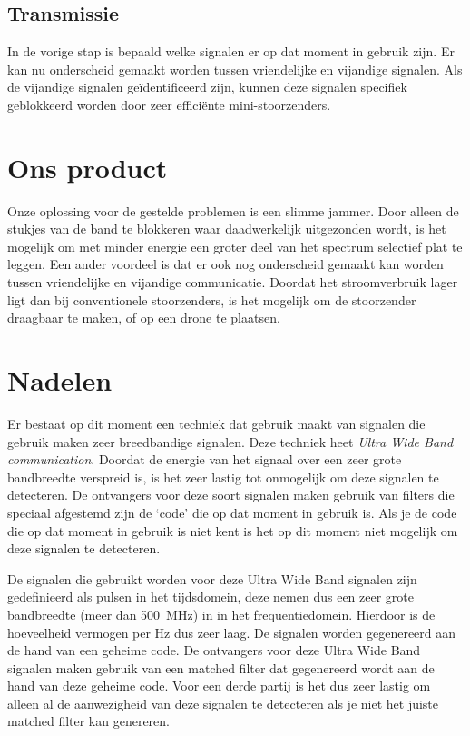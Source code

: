 \documentclass[oneside, a4paper, openany]{memoir}
\begin{document}
\subsection{Transmissie}
In de vorige stap is bepaald welke signalen er op dat moment in gebruik zijn. Er kan nu onderscheid gemaakt worden tussen vriendelijke en vijandige signalen. Als de vijandige signalen geïdentificeerd zijn, kunnen deze signalen specifiek geblokkeerd worden door zeer efficiënte mini-stoorzenders.

\section{Ons product}
Onze oplossing voor de gestelde problemen is een slimme jammer. Door alleen de stukjes van de band te blokkeren waar daadwerkelijk uitgezonden wordt, is het mogelijk om met minder energie een groter deel van het spectrum selectief plat te leggen. Een ander voordeel is dat er ook nog onderscheid gemaakt kan worden tussen vriendelijke en vijandige communicatie. Doordat het stroomverbruik lager ligt dan bij conventionele stoorzenders, is het mogelijk om de stoorzender draagbaar te maken, of op een drone te plaatsen.

\section{Nadelen}
Er bestaat op dit moment een techniek dat gebruik maakt van signalen die gebruik maken zeer breedbandige signalen. Deze techniek heet \textit{Ultra Wide Band communication}. Doordat de energie van het signaal over een zeer grote bandbreedte verspreid is, is het zeer lastig tot onmogelijk om deze signalen te detecteren. De ontvangers voor deze soort signalen maken gebruik van filters die speciaal afgestemd zijn de `code' die op dat moment in gebruik is. Als je de code die op dat moment in gebruik is niet kent is het op dit moment niet mogelijk om deze signalen te detecteren.

\begin{blockDetail}
De signalen die gebruikt worden voor deze Ultra Wide Band signalen zijn gedefinieerd als pulsen in het tijdsdomein, deze nemen dus een zeer grote bandbreedte (meer dan \SI{500}{\mega\hertz}) in in het frequentiedomein. Hierdoor is de hoeveelheid vermogen per \si{\hertz} dus zeer laag. De signalen worden gegenereerd aan de hand van een geheime code. De ontvangers voor deze Ultra Wide Band signalen maken gebruik van een matched filter dat gegenereerd wordt aan de hand van deze geheime code. Voor een derde partij is het dus zeer lastig om alleen al de aanwezigheid van deze signalen te detecteren als je niet het juiste matched filter kan genereren.
\end{blockDetail}
\end{document}
